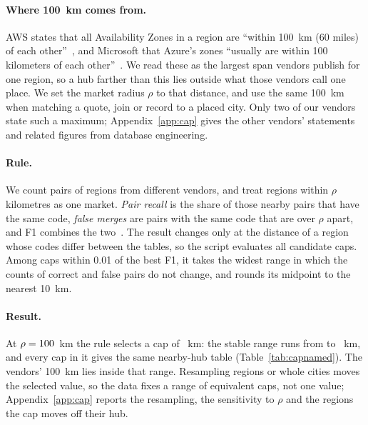 \documentclass[10pt,twocolumn]{article}
\begin{document}
\paragraph{Where 100~km comes from.} AWS states that all Availability Zones in a region are ``within 100~km (60 miles) of each other''~\citep{aws_regions_az,aws_fault_isolation}, and Microsoft that Azure's zones ``usually are within 100 kilometers of each other''~\citep{azure_availability_zones}. We read these as the largest span vendors publish for one region, so a hub farther than this lies outside what those vendors call one place. We set the market radius $\rho$ to that distance, and use the same 100~km when matching a quote, join or record to a placed city. Only two of our \providerCount{} vendors state such a maximum; Appendix~\ref{app:cap} gives the other vendors' statements and related figures from database engineering.

\paragraph{Rule.} We count pairs of regions from different vendors, and treat regions within $\rho$ kilometres as one market. \emph{Pair recall} is the share of those nearby pairs that have the same code, \emph{false merges} are pairs with the same code that are over $\rho$ apart, and F1 combines the two~\citep{vanrijsbergen1979information}. The result changes only at the distance of a region whose codes differ between the tables, so the script evaluates all \capCount{} candidate caps. Among caps within 0.01 of the best F1, it takes the widest range in which the counts of correct and false pairs do not change, and rounds its midpoint to the nearest 10~km.

\paragraph{Result.} At $\rho=\capRadius$~km the rule selects a cap of \capSelected{}~km: the stable range runs from \capLow{} to \capHigh{}~km, and every cap in it gives the same nearby-hub table (Table~\ref{tab:capnamed}). The vendors' 100~km lies inside that range. Resampling regions or whole cities moves the selected value, so the data fixes a range of equivalent caps, not one value; Appendix~\ref{app:cap} reports the resampling, the sensitivity to $\rho$ and the regions the cap moves off their hub.

\begin{table}[tp]
\centering
\small

\caption{Selected caps at $\rho=\capRadius$~km. Codes: distinct codes. Shared: regions on a code used by at least two vendors. FM: false merges over the stated distance in kilometres.}
\label{tab:capnamed}
\end{table}
\end{document}
